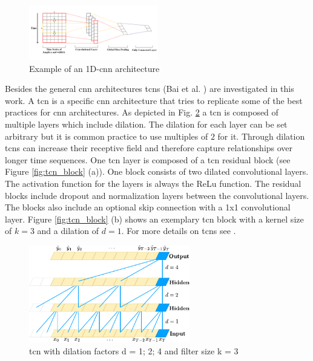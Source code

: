 \documentclass[conference]{IEEEtran}
\begin{document}
\begin{figure}[htp]
	\centering
	\includegraphics[width=0.5\textwidth]{1D_CNN_Architecture.png}
	\caption{Example of an 1D-\gls{cnn} architecture \cite{Sayyad}}
	\label{fig:1D_cnn_architecture}
\end{figure}

Besides the general \gls{cnn} architectures \glspl{tcn} (Bai et al. \cite{Bai2018}) are investigated in this work. A \gls{tcn} is a specific \gls{cnn} architecture that tries to replicate some of the best practices for \gls{cnn} architectures. As depicted in Fig. \ref{fig:tcn_architecture} a \gls{tcn} is composed of multiple layers which include dilation. The dilation for each layer can be set arbitrary but it is common practice to use multiples of $ 2 $ for it. Through dilation \glspl{tcn} can increase their receptive field and therefore capture relationships over longer time sequences. One \gls{tcn} layer is composed of a \gls{tcn} residual block (see Figure \ref{fig:tcn_block} (a)). One block consists of two dilated convolutional layers. The activation function for the layers is always the ReLu function. The residual blocks include dropout and normalization layers between the convolutional layers. The blocks also include an optional skip connection with a 1x1 convolutional layer. Figure \ref{fig:tcn_block} (b) shows an exemplary \gls{tcn} block with a kernel size of $ k = 3 $ and a dilation of $ d = 1 $. For more details on \glspl{tcn} see \cite{Bai2018}.

\begin{figure}[htp]
	\centering
	\includegraphics[width=7cm]{tcn_architecture.pdf}
	\caption{\gls{tcn} with dilation factors d = 1; 2; 4 and filter size k = 3 \cite{Bai2018}}
	\label{fig:tcn_architecture}
\end{figure}
\end{document}
